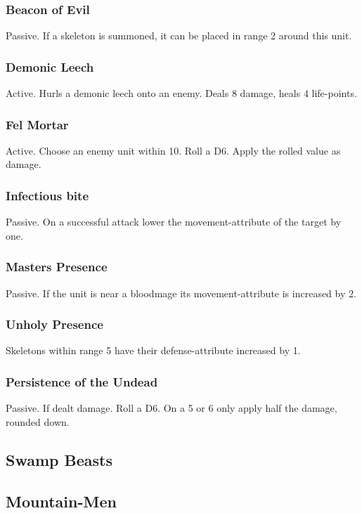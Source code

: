 \documentclass[a5paper,pagesize,10pt,bibtotoc,pointlessnumbers,
normalheadings,DIV=9,twoside=false]{scrbook}
\begin{document}
\subsubsection{Beacon of Evil}
Passive. If a skeleton is summoned, it can be placed in range 2 around this unit.

\subsubsection{Demonic Leech}
Active. Hurls a demonic leech onto an enemy. Deals 8 damage, heals 4 life-points.

\subsubsection{Fel Mortar}
Active. Choose an enemy unit within 10. Roll a D6. Apply the rolled value as damage.

\subsubsection{Infectious bite}
Passive. On a successful attack lower the movement-attribute of the target by one.

\subsubsection{Masters Presence}
Passive. If the unit is near a bloodmage its movement-attribute is increased by 2.

\subsubsection{Unholy Presence}
Skeletons within range 5 have their defense-attribute increased by 1.

\subsubsection{Persistence of the Undead}
Passive. If dealt damage. Roll a D6. On a 5 or 6 only apply half the damage, rounded down.

\newpage
\subsection{Swamp Beasts}

\newpage
\subsection{Mountain-Men}
\end{document}
